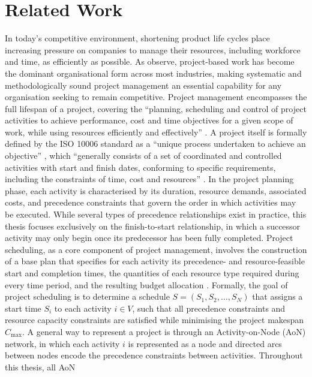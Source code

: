 \chapter{Related Work}
\label{chap:relatedwork}
In today's competitive environment, shortening product life cycles place increasing
pressure on companies to manage their resources, including workforce and time, as
efficiently as possible. As \cite{Zimmermann2006} observe, project-based work has
become the dominant organisational form across most industries, making systematic and
methodologically sound project management an essential capability for any organisation
seeking to remain competitive. Project management encompasses the full lifespan of a
project, covering the ``planning, scheduling and control of project activities to achieve
performance, cost and time objectives for a given scope of work, while using resources
efficiently and effectively'' \parencite[p.~4]{Demeulemeester2002}. A project itself is
formally defined by the ISO 10006 standard as a ``unique process undertaken to achieve
an objective'' \parencite[p.~2]{ISO2017}, which ``generally consists of a set of
coordinated and controlled activities with start and finish dates, conforming to
specific requirements, including the constraints of time, cost and resources''
\parencite[p.~2]{ISO2017}. In the project planning phase, each activity is
characterised by its duration, resource demands, associated costs, and precedence
constraints that govern the order in which activities may be executed. While several
types of precedence relationships exist in practice, this thesis focuses exclusively on
the finish-to-start relationship, in which a successor activity may only begin once its
predecessor has been fully completed.
Project scheduling, as a core component of project management, involves the
construction of a base plan that specifies for each activity its precedence- and
resource-feasible start and completion times, the quantities of each resource type
required during every time period, and the resulting budget allocation
\parencite[p.~10]{Demeulemeester2002}. Formally, the goal of project scheduling is to
determine a schedule \(S = (S_1, S_2, \ldots, S_N)\) that assigns a start time \(S_i\)
to each activity \(i \in V\), such that all precedence constraints and resource capacity
constraints are satisfied while minimising the project makespan \(C_{\max}\).
A general way to represent a project is through an Activity-on-Node (AoN) network, in
which each activity \(i\) is represented as a node and directed arcs between nodes
encode the precedence constraints between activities. Throughout this thesis, all AoN
